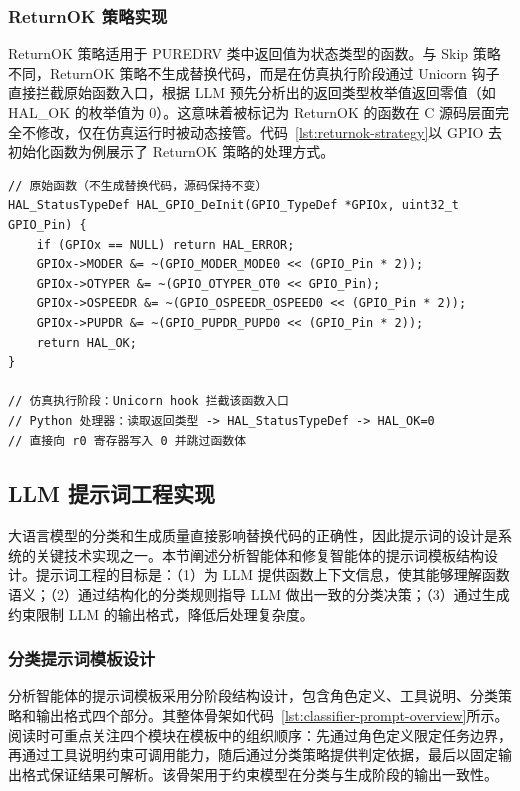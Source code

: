 \subsubsection{ReturnOK 策略实现}

ReturnOK 策略适用于 PUREDRV 类中返回值为状态类型的函数。与 Skip 策略不同，ReturnOK 策略不生成替换代码，而是在仿真执行阶段通过 Unicorn 钩子直接拦截原始函数入口，根据 LLM 预先分析出的返回类型枚举值返回零值（如 HAL\_OK 的枚举值为 0）。这意味着被标记为 ReturnOK 的函数在 C 源码层面完全不修改，仅在仿真运行时被动态接管。代码~\ref{lst:returnok-strategy}以 GPIO 去初始化函数为例展示了 ReturnOK 策略的处理方式。

\begin{lstlisting}[style=CStyle,abovecaptionskip=0pt,belowcaptionskip=0pt,caption=ReturnOK 策略处理示例,label=lst:returnok-strategy]
// 原始函数（不生成替换代码，源码保持不变）
HAL_StatusTypeDef HAL_GPIO_DeInit(GPIO_TypeDef *GPIOx, uint32_t GPIO_Pin) {
    if (GPIOx == NULL) return HAL_ERROR;
    GPIOx->MODER &= ~(GPIO_MODER_MODE0 << (GPIO_Pin * 2));
    GPIOx->OTYPER &= ~(GPIO_OTYPER_OT0 << GPIO_Pin);
    GPIOx->OSPEEDR &= ~(GPIO_OSPEEDR_OSPEED0 << (GPIO_Pin * 2));
    GPIOx->PUPDR &= ~(GPIO_PUPDR_PUPD0 << (GPIO_Pin * 2));
    return HAL_OK;
}

// 仿真执行阶段：Unicorn hook 拦截该函数入口
// Python 处理器：读取返回类型 -> HAL_StatusTypeDef -> HAL_OK=0
// 直接向 r0 寄存器写入 0 并跳过函数体
\end{lstlisting}

\subsection{LLM 提示词工程实现}
\label{sec:prompt-engineering}

大语言模型的分类和生成质量直接影响替换代码的正确性，因此提示词的设计是系统的关键技术实现之一。本节阐述分析智能体和修复智能体的提示词模板结构设计。提示词工程的目标是：（1）为 LLM 提供函数上下文信息，使其能够理解函数语义；（2）通过结构化的分类规则指导 LLM 做出一致的分类决策；（3）通过生成约束限制 LLM 的输出格式，降低后处理复杂度。

\subsubsection{分类提示词模板设计}

分析智能体的提示词模板采用分阶段结构设计，包含角色定义、工具说明、分类策略和输出格式四个部分。其整体骨架如代码~\ref{lst:classifier-prompt-overview}所示。阅读时可重点关注四个模块在模板中的组织顺序：先通过角色定义限定任务边界，再通过工具说明约束可调用能力，随后通过分类策略提供判定依据，最后以固定输出格式保证结果可解析。该骨架用于约束模型在分类与生成阶段的输出一致性。

